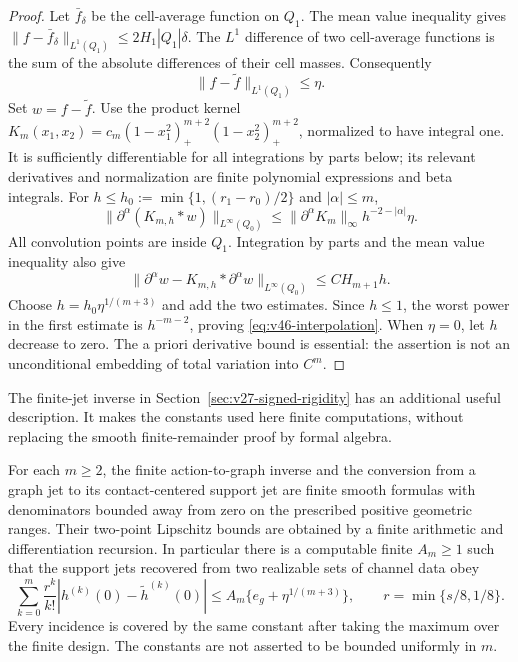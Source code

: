 \begin{proof}
Let $\bar f_\delta$ be the cell-average function on $Q_1$.  The mean value
inequality gives
$\|f-\bar f_\delta\|_{L^1(Q_1)}\le2H_1|Q_1|\delta$.
The $L^1$ difference of two cell-average functions is the sum of the absolute
differences of their cell masses.  Consequently
\begin{equation}\label{eq:v46-cell-l1}
 \|f-\widetilde f\|_{L^1(Q_1)}\le\eta.
\end{equation}
Set $w=f-\widetilde f$.  Use the product kernel
$K_m(x_1,x_2)=c_m(1-x_1^2)_+^{m+2}(1-x_2^2)_+^{m+2}$,
normalized to have integral one.  It is sufficiently differentiable for
all integrations by parts below; its relevant derivatives and normalization
are finite polynomial expressions and beta integrals.  For
$h\le h_0:=\min\{1,(r_1-r_0)/2\}$ and $|\alpha|\le m$,
\[
 \|\partial^\alpha(K_{m,h}*w)\|_{L^\infty(Q_0)}
 \le\|\partial^\alpha K_m\|_\infty h^{-2-|\alpha|}\eta.
\]
All convolution points are inside $Q_1$.  Integration by parts and the
mean value inequality also give
\[
 \|\partial^\alpha w-K_{m,h}*\partial^\alpha w\|_{L^\infty(Q_0)}
 \le C H_{m+1}h.
\]
Choose $h=h_0\eta^{1/(m+3)}$ and add the two estimates.  Since $h\le1$,
the worst power in the first estimate is $h^{-m-2}$, proving
\eqref{eq:v46-interpolation}.  When $\eta=0$, let $h$ decrease to zero.
The a priori derivative bound is essential: the assertion is not an
unconditional embedding of total variation into $C^m$.
\end{proof}

The finite-jet inverse in Section~\ref{sec:v27-signed-rigidity} has an
additional useful description.  It makes the constants used here finite
computations, without replacing the smooth finite-remainder proof by
formal algebra.

\begin{lemma}
\label{lem:v46-bellman}
For each $m\ge2$, the finite action-to-graph inverse and the conversion
from a graph jet to its contact-centered support jet are finite smooth
formulas with denominators bounded away from zero on the prescribed
positive geometric ranges.  Their two-point Lipschitz bounds are obtained
by a finite arithmetic and differentiation recursion.  In particular there
is a computable finite $A_m\ge1$ such that the support jets recovered from
two realizable sets of channel data obey
\begin{equation}\label{eq:v46-support-jet-error}
 \sum_{k=0}^m\frac{r^k}{k!}
       |h^{(k)}(0)-\widetilde h^{(k)}(0)|
 \le A_m\{e_g+\eta^{1/(m+3)}\},
 \qquad r=\min\{s/8,1/8\}.
\end{equation}
Every incidence is covered by the same constant after taking the maximum
over the finite design.  The constants are not asserted to be bounded
uniformly in $m$.
\end{lemma}

